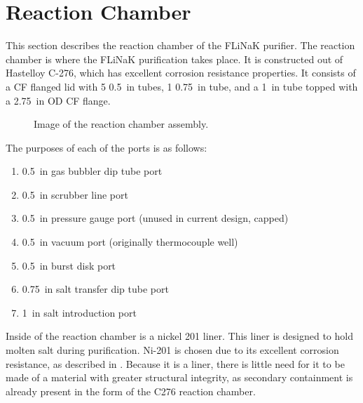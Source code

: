 %
%

\section{Reaction Chamber}

This section describes the reaction chamber of the FLiNaK purifier.
The reaction chamber is where the FLiNaK purification takes place.
It is constructed out of Hastelloy C-276, which has excellent
corrosion resistance properties. \cite{c276-resistance}
It consists of a CF flanged lid with 5 \SI{0.5}{in} tubes,
1 \SI{0.75}{in} tube, and a \SI{1}{in} tube topped with a \SI{2.75}{in}
OD CF flange.
\par

\begin{figure}
  \centering
  \caption{Image of the reaction chamber assembly.}
  \label{fig: reaction chamber assembly}
\end{figure}

The purposes of each of the ports is as follows:

\begin{enumerate}
  \item \SI{0.5}{in} gas bubbler dip tube port
  \item \SI{0.5}{in} scrubber line port
  \item \SI{0.5}{in} pressure gauge port (unused in current design, capped)
  \item \SI{0.5}{in} vacuum port (originally thermocouple well)
  \item \SI{0.5}{in} burst disk port
  \item \SI{0.75}{in} salt transfer dip tube port
  \item \SI{1}{in} salt introduction port
\end{enumerate}

Inside of the reaction chamber is a nickel 201 liner. This liner is
designed to hold molten salt during purification. Ni-201 is chosen due to its
excellent corrosion resistance, as described in .
Because it is a liner, there is little need for it to be made of a
material with greater structural integrity, as secondary containment
is already present in the form of the C276 reaction chamber. \par
